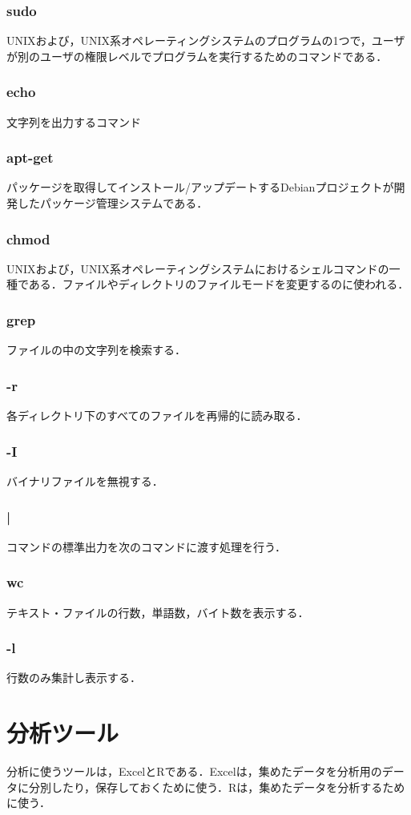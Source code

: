 \subsubsection{sudo}
UNIXおよび，UNIX系オペレーティングシステムのプログラムの1つで，ユーザが別のユーザの権限レベルでプログラムを実行するためのコマンドである．
\subsubsection{echo}
文字列を出力するコマンド
\subsubsection{apt-get}
パッケージを取得してインストール/アップデートするDebianプロジェクトが開発したパッケージ管理システムである．
\subsubsection{chmod}
UNIXおよび，UNIX系オペレーティングシステムにおけるシェルコマンドの一種である．ファイルやディレクトリのファイルモードを変更するのに使われる．
\subsubsection{grep}
ファイルの中の文字列を検索する．
\subsubsection{-r}
各ディレクトリ下のすべてのファイルを再帰的に読み取る．
\subsubsection{-I}
バイナリファイルを無視する．
\subsubsection{|}
コマンドの標準出力を次のコマンドに渡す処理を行う．
\subsubsection{wc}
テキスト・ファイルの行数，単語数，バイト数を表示する．
\subsubsection{-l}
行数のみ集計し表示する．



\section{分析ツール}
分析に使うツールは，ExcelとRである．Excelは，集めたデータを分析用のデータに分別したり，保存しておくために使う．Rは，集めたデータを分析するために使う．

